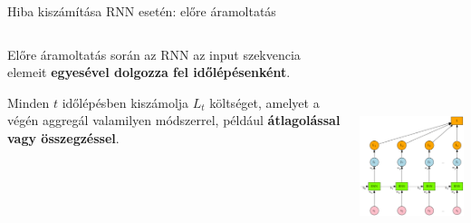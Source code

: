 \documentclass[english, aspectratio=169]{beamer}
\begin{document}
\begin{frame}{Hiba kiszámítása RNN esetén: előre áramoltatás}
\begin{columns}
\begin{column}{.5\textwidth}
Előre áramoltatás során az RNN az input szekvencia elemeit \textbf{egyesével dolgozza fel időlépésenként}. \par\smallskip
Minden $t$ időlépésben kiszámolja $L_t$ költséget, amelyet a végén aggregál valamilyen módszerrel, például \textbf{átlagolással vagy összegzéssel}.  
\end{column}
\begin{column}{.5\textwidth}
\begin{center}
\includegraphics[height=7cm, width=7cm, keepaspectratio]{graphs/recurrent_10.png}
\end{center}
\end{column}
\end{columns}
\end{frame}
\end{document}
